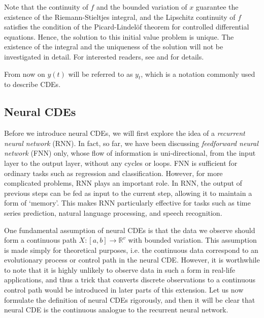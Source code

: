 \documentclass[a4paper,11pt,titlepage]{article}
\theoremstyle{definition}
\theoremstyle{plain}
\theoremstyle{remark}
\begin{document}
Note that the continuity of $f$ and the bounded variation of $x$ guarantee the existence of the Riemann-Stieltjes integral, and the Lipschitz continuity of $f$ satisfies the condition of the Picard-Lindelöf theorem for controlled differential equations. Hence, the solution to this initial value problem is unique. The existence of the integral and the uniqueness of the solution will not be investigated in detail. For interested readers, see \cite{kidger2022neural} and \cite{rudin1953} for details.

From now on $y(t)$ will be referred to as $y_t$, which is a notation commonly used to describe CDEs.

\subsection{Neural CDEs}

Before we introduce neural CDEs, we will first explore the idea of a \textit{recurrent neural network} (RNN). In fact, so far, we have been discussing \textit{feedforward neural network} (FNN) only, whose flow of information is uni-directional, from the input layer to the output layer, without any cycles or loops. FNN is sufficient for ordinary tasks such as regression and classification. However, for more complicated problems, RNN plays an important role. In RNN, the output of previous steps can be fed as input to the current step, allowing it to maintain a form of ‘memory’. This makes RNN particularly effective for tasks such as time series prediction, natural language processing, and speech recognition.

One fundamental assumption of neural CDEs is that the data we observe should form a continuous path $X:[a,b]\rightarrow\mathbb{R}^v$ with bounded variation. This assumption is made simply for theoretical purposes, i.e. the continuous data correspond to an evolutionary process or control path in the neural CDE. However, it is worthwhile to note that it is highly unlikely to observe data in such a form in real-life applications, and thus a trick that converts discrete observations to a continuous control path would be introduced in later parts of this extension. Let us now formulate the definition of neural CDEs rigorously, and then it will be clear that neural CDE is the continuous analogue to the recurrent neural network.
\end{document}
